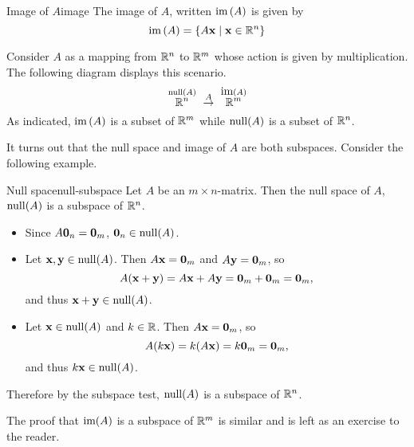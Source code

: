 \begin{definition}{Image of $A$}{image}
  The image of $A$, written $\mbox{\rm im}\left(A\right)$ is given by
  \begin{equation*}
    \mbox{\rm im}\left(A \right) = \left\{A\mbox{\bf x} \mid \mbox{\bf x} \in \mathbb{R}^n \right\}
  \end{equation*}
\end{definition}

Consider $A$ as a mapping from $\mathbb{R}^{n}$ to $\mathbb{R}^{m}$ whose action is
given by multiplication. The following diagram displays this scenario.
\begin{equation*}
  \overset{\nullspace(A) }{\R^{n}}\ \overset{A}{\rightarrow }\
  \overset{
    \func{im}\tup{A} }{\R^{m}}
\end{equation*}
As indicated, $\mbox{\rm im}\left(A\right) $ is a subset of $\mathbb{R}^{m}$ while
$\nullspace(A) $ is a subset of $\mathbb{R}^{n}$.

It turns out that the null space and image of $A$ are both
subspaces. Consider the following example.

\begin{example}{Null space}{null-subspace}
  Let $A$ be an $m\times n$-matrix. Then the null space of $A$,
  $\nullspace(A)$ is a subspace of $\mathbb{R}^n$.
\end{example}

\begin{solution}
  \begin{itemize}
  \item Since $A\mbox{\bf 0}_n=\mbox{\bf 0}_m$, $\vect{0}_n\in\nullspace(A)$.
  \item Let $\vect{x},\vect{y}\in\nullspace(A)$.  Then
    $A\mbox{\bf x}=\mbox{\bf 0}_m$ and $A\mbox{\bf y}=\mbox{\bf 0}_m$, so
    \begin{equation*}
      A(\mbox{\bf x}+\mbox{\bf y})=A\mbox{\bf x}+A\mbox{\bf y} = \mbox{\bf 0}_m+\mbox{\bf 0}_m=\mbox{\bf 0}_m,
    \end{equation*}
    and thus $\vect{x}+\vect{y}\in\nullspace(A)$.
  \item Let $\vect{x}\in\nullspace(A)$ and $k\in\mathbb{R}$.  Then
    $A\mbox{\bf x}=\mbox{\bf 0}_m$, so
    \begin{equation*}
      A(k\mbox{\bf x}) = k(A\mbox{\bf x})=k\mbox{\bf 0}_m=\mbox{\bf 0}_m,
    \end{equation*}
    and thus $k\vect{x}\in\nullspace(A)$.
  \end{itemize}
  Therefore by the subspace test, $\nullspace(A)$ is a subspace of $\mathbb{R}^n$.
\end{solution}

The proof that $\mbox{\rm im}(A)$ is a subspace of $\mathbb{R}^m$ is similar and
is left as an exercise to the reader.

